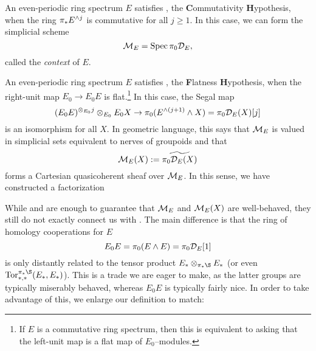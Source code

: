 \begin{definition}
An even-periodic ring spectrum $E$ satisfies \CH, the \textbf Commutativity \textbf Hypothesis, when the ring $\pi_* E^{\wedge j}$ is commutative for all $j \ge 1$.  In this case, we can form the simplicial scheme \[\mathcal{M}_{E} = \operatorname{Spec} \pi_0 \mathcal D_E,\] called the \textit{context} of $E$.
\end{definition}

\begin{definition}
An even-periodic ring spectrum $E$ satisfies \FH, the \textbf Flatness \textbf Hypothesis, when the right-unit map $E_0 \to E_0 E$ is flat.\footnote{If $E$ is a commutative ring spectrum, then this is equivalent to asking that the left-unit map is a flat map of $E_0$--modules.}  In this case, the Segal map \[(E_0 E)^{\otimes_{E_0} j} \otimes_{E_0} E_0 X \to \pi_0(E^{\wedge (j+1)} \wedge X) = \pi_0 \mathcal D_E(X)[j]\] is an isomorphism for all $X$.  In geometric language, this says that $\mathcal{M}_{E}$ is valued in simplicial sets equivalent to nerves of groupoids and that \[\mathcal{M}_{E}(X) := \widetilde{\pi_0 \mathcal D_E(X)}\] forms a Cartesian quasicoherent sheaf over $\mathcal{M}_{E}$.  In this sense, we have constructed a factorization
\begin{center}
\end{center}
\end{definition}

While {\CH} and {\FH} are enough to guarantee that $\mathcal{M}_{E}$ and $\mathcal{M}_{E}(X)$ are well-behaved, they still do not exactly connect us with .  The main difference is that the ring of homology cooperations for $E$ \[E_0 E = \pi_0(E \wedge E) = \pi_0 \mathcal D_E[1]\] is only distantly related to the tensor product $E_* \otimes_{\pi_* \S} E_*$ (or even $\Tor^{\pi_* \S}_{*, *}(E_*, E_*)$).  This is a trade we are eager to make, as the latter groups are typically miserably behaved, whereas $E_0 E$ is typically fairly nice.  In order to take advantage of this, we enlarge our definition to match:

